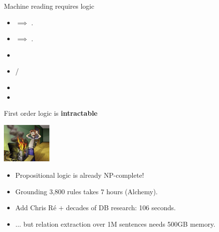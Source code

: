 \begin{frame}{Machine reading requires logic}

\begin{itemize}
\item {} $\implies$ .
\item {} $\implies$ .
\end{itemize}
\vspace{1ex}
\pause

\begin{itemize}
\item {}
\item {} / 
\end{itemize}
\vspace{1ex}
\pause

\begin{itemize}
\item {}
\item {}
\end{itemize}

\end{frame}


\begin{frame}{First order logic is \textbf{intractable}}
\begin{center}
  \includegraphics[height=2cm]{../img/overheating.jpg}
\end{center}

\begin{itemize}
  \item Propositional logic is already NP-complete!
\end{itemize}
\vspace{1ex}
\pause

\begin{itemize}
  \item Grounding 3,800 rules takes 7 hours (Alchemy).
  \pause
  \item Add Chris R\'{e} $+$ decades of DB research: 106 seconds.
  \item $\dots$ but relation extraction over 1M sentences needs 500GB memory.
\end{itemize}
\vspace{1ex}
\pause


\end{frame}


